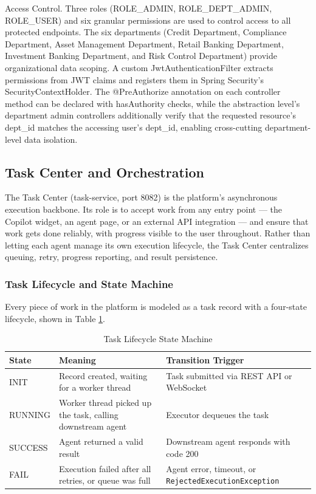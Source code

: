 Access Control. Three roles (ROLE\_ADMIN, ROLE\_DEPT\_ADMIN, ROLE\_USER) and six granular permissions are used to control access to all protected endpoints. The six departments (Credit Department, Compliance Department, Asset Management Department, Retail Banking Department, Investment Banking Department, and Risk Control Department) provide organizational data scoping. A custom JwtAuthenticationFilter extracts permissions from JWT claims and registers them in Spring Security's SecurityContextHolder. The @PreAuthorize annotation on each controller method can be declared with hasAuthority checks, while the abstraction level's department admin controllers additionally verify that the requested resource's dept\_id matches the accessing user's dept\_id, enabling cross-cutting department-level data isolation.

\subsection{Task Center and Orchestration}

The Task Center (task-service, port 8082) is the platform's asynchronous execution backbone. Its role is to accept work from any entry point --- the Copilot widget, an agent page, or an external API integration --- and ensure that work gets done reliably, with progress visible to the user throughout. Rather than letting each agent manage its own execution lifecycle, the Task Center centralizes queuing, retry, progress reporting, and result persistence.

\subsubsection{Task Lifecycle and State Machine}

Every piece of work in the platform is modeled as a task record with a four-state lifecycle, shown in Table \ref{tab:task-lifecycle}.

\begin{table}[H]
\small\singlespacing
\centering
\caption{Task Lifecycle State Machine}
\label{tab:task-lifecycle}
\begin{tabularx}{\textwidth}{>{\RaggedRight\arraybackslash}p{}>{\RaggedRight\arraybackslash}p{}>{\RaggedRight\arraybackslash}X}
\toprule
\textbf{State} & \textbf{Meaning} & \textbf{Transition Trigger} \\
\midrule
INIT & Record created, waiting for a worker thread & Task submitted via REST API or WebSocket \\
RUNNING & Worker thread picked up the task, calling downstream agent & Executor dequeues the task \\
SUCCESS & Agent returned a valid result & Downstream agent responds with code 200 \\
FAIL & Execution failed after all retries, or queue was full & Agent error, timeout, or \texttt{RejectedExecutionException} \\
\bottomrule
\end{tabularx}
\end{table}


